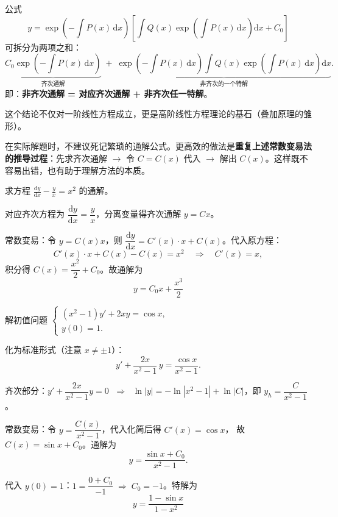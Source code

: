 \documentclass[lang=cn,11pt]{elegantbook}
\begin{document}
\begin{property}[通解的结构]
公式 \[y=\exp\!\left(-\int P(x)\,\mathrm{d}x\right)\left[\int Q(x)\exp\!\left(\int P(x)\,\mathrm{d}x\right)\mathrm{d}x+C_0\right]\] 可拆分为两项之和：
\[
\underbrace{C_0\exp\!\left(-\int P(x)\,\mathrm{d}x\right)}_{\text{齐次通解}}
\;+\;
\underbrace{\exp\!\left(-\int P(x)\,\mathrm{d}x\right)\int Q(x)\exp\!\left(\int P(x)\,\mathrm{d}x\right)\mathrm{d}x}_{\text{非齐次的一个特解}}.
\]
即：\textbf{非齐次通解 = 对应齐次通解 + 非齐次任一特解}。

这个结论不仅对一阶线性方程成立，更是高阶线性方程理论的基石（叠加原理的雏形）。
\end{property}

\begin{remark}[使用建议]
在实际解题时，不建议死记繁琐的通解公式。更高效的做法是\textbf{重复上述常数变易法的推导过程}：先求齐次通解 $\to$ 令 $C=C(x)$ 代入 $\to$ 解出 $C(x)$。这样既不容易出错，也有助于理解方法的本质。
\end{remark}

\begin{exercise}
求方程 $\displaystyle\frac{\mathrm{d}y}{\mathrm{d}x}-\frac{y}{x}=x^{2}$ 的通解。
\end{exercise}
\begin{solution}
对应齐次方程为 $\dfrac{\mathrm{d}y}{\mathrm{d}x}=\dfrac{y}{x}$，分离变量得齐次通解 $y=Cx$。

常数变易：令 $y=C(x)x$，则 $\dfrac{\mathrm{d}y}{\mathrm{d}x}=C'(x)\cdot x+C(x)$。代入原方程：
\[
C'(x)\cdot x+C(x)-C(x)=x^{2}\quad\Longrightarrow\quad C'(x)=x,
\]
积分得 $C(x)=\dfrac{x^{2}}{2}+C_0$。故通解为
\[
\boxed{y=C_0x+\frac{x^{3}}{2}}
\]
\end{solution}

\begin{exercise}
解初值问题
$\begin{cases}(x^{2}-1)y'+2xy=\cos x,\\ y(0)=1.\end{cases}$
\end{exercise}
\begin{solution}
化为标准形式（注意 $x \neq \pm1$）：
\[
y'+\frac{2x}{x^{2}-1}\,y=\frac{\cos x}{x^{2}-1}.
\]

齐次部分：$y'+\dfrac{2x}{x^{2}-1}y=0$
$\;\Longrightarrow\;$ $\ln|y|=-\ln|x^{2}-1|+\ln|C|$，即 $y_h=\dfrac{C}{x^{2}-1}$。

常数变易：令 $y=\dfrac{C(x)}{x^{2}-1}$，代入化简后得 $C'(x)=\cos x$，
故 $C(x)=\sin x+C_0$。通解为
\[
y=\frac{\sin x+C_0}{x^{2}-1}.
\]

代入 $y(0)=1$：$1=\dfrac{0+C_0}{-1}\;\Rightarrow\; C_0=-1$。特解为
\[
\boxed{y=\frac{1-\sin x}{1-x^{2}}}
\]
\end{solution}
\end{document}
